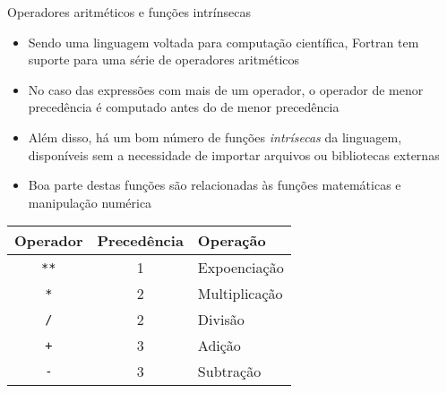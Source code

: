 \begin{frame}[fragile]{Operadores aritméticos e funções intrínsecas}

    \begin{itemize}
        \item Sendo uma linguagem voltada para computação científica, Fortran tem suporte para
            uma série de operadores aritméticos

        \item No caso das expressões com mais de um operador, o operador de menor precedência é
            computado antes do de menor precedência
        \item Além disso, há um bom número de funções \textit{intrísecas} da linguagem, disponíveis
            sem a necessidade de importar arquivos ou bibliotecas externas

        \item Boa parte destas funções são relacionadas às funções matemáticas e manipulação
            numérica
    \end{itemize}

    \begin{table}[ht]
        \centering
        \begin{tabular}{ccl}
            \toprule
            \textbf{Operador} & \textbf{Precedência} & \textbf{Operação} \\
            \midrule
                \texttt{**} & 1 & Expoenciação \\
                \texttt{*} & 2 & Multiplicação \\
                \texttt{/} & 2 & Divisão \\
                \texttt{+} & 3 & Adição \\
                \texttt{-} & 3 & Subtração \\
            \bottomrule
        \end{tabular}
    \end{table}
\end{frame}

